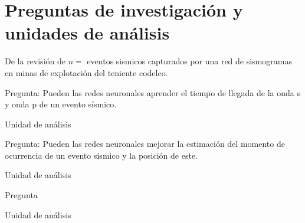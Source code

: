 
\section{Preguntas de investigación y unidades de análisis}
De la revisión de $n=$ eventos sismicos capturados por una red de sismogramas en
minas de explotación del teniente codelco.

Pregunta: Pueden las redes neuronales aprender el tiempo de llegada de la onda s
y onda p de un evento sísmico.

Unidad de análisis

Pregunta: Pueden las redes neuronales mejorar la estimación del momento de
ocurrencia de un evento sísmico y la posición de este.

Unidad de análisis

Pregunta

Unidad de análisis